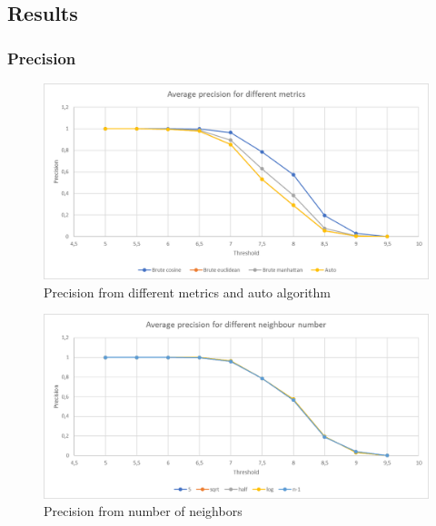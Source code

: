 \documentclass[12pt]{article}
\begin{document}
\subsection{Results}
\subsubsection{Precision}
\begin{figure}[H]
  \caption{Precision from different metrics and auto algorithm}
  \includegraphics[width=\textwidth]{precision_metric.png}
\end{figure}
\begin{figure}[H]
  \caption{Precision from number of neighbors}
  \includegraphics[width=\textwidth]{precision_neighbor.png}
\end{figure}
\end{document}
